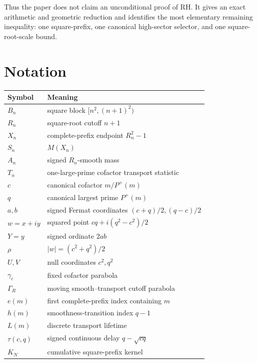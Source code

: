 \documentclass[11pt]{article}
\theoremstyle{definition}
\theoremstyle{remark}
\newcommand{\Pplus}{P^{+}}
\newcommand{\1}{\mathbf{1}}
\begin{document}
Thus the paper does not claim an unconditional proof of RH.  It gives an exact arithmetic and geometric reduction and identifies the most elementary remaining inequality: one square-prefix, one canonical high-sector selector, and one square-root-scale bound.


\appendix
\section{Notation}

\begin{table}[htbp]
\centering
\small
\renewcommand{\arraystretch}{1.25}
\begin{tabular}{ll}
\toprule
Symbol & Meaning\\
\midrule
$B_n$ & square block $[n^2,(n+1)^2)$\\
$R_n$ & square-root cutoff $n+1$\\
$X_n$ & complete-prefix endpoint $R_n^2-1$\\
$S_n$ & $M(X_n)$\\
$A_n$ & signed $R_n$-smooth mass\\
$T_n$ & one-large-prime cofactor transport statistic\\
$c$ & canonical cofactor $m/\Pplus(m)$\\
$q$ & canonical largest prime $\Pplus(m)$\\
$a,b$ & signed Fermat coordinates $(c+q)/2,(q-c)/2$\\
$w=x+iy$ & squared point $cq+i(q^2-c^2)/2$\\
$Y=y$ & signed ordinate $2ab$\\
$\rho$ & $|w|=(c^2+q^2)/2$\\
$U,V$ & null coordinates $c^2,q^2$\\
$\gamma_c$ & fixed cofactor parabola\\
$\Gamma_R$ & moving smooth--transport cutoff parabola\\
$e(m)$ & first complete-prefix index containing $m$\\
$h(m)$ & smoothness-transition index $q-1$\\
$L(m)$ & discrete transport lifetime\\
$\tau(c,q)$ & signed continuous delay $q-\sqrt{cq}$\\
$K_N$ & cumulative square-prefix kernel\\
\bottomrule
\end{tabular}
\end{table}
\end{document}
